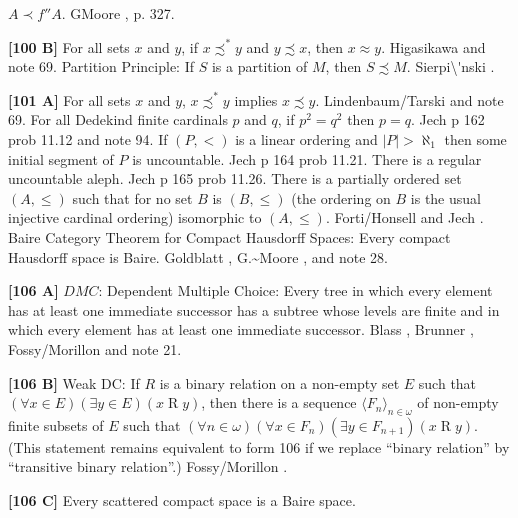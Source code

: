 $A \prec f''A$. G\. \ac{Moore} \cite{1982}, p. 327.
\smallskip
\item{}{\bf [100 B]} For all sets $x$ and $y$, if $x\precsim^* y$ and
$y\precsim x$, then $x\approx y$. \ac{Higasikawa} \cite{1995} and note 69.
\medskip
{}  Partition Principle:  If $S$ is a partition of
$M$, then $S \precsim M$.  \ac{Sierpi\'nski} \cite{1947}.
\smallskip
\item{}{\bf [101 A]}  For all sets $x$ and $y$, $x \precsim^* y$ implies
$x\precsim y$.  \ac{Lindenbaum/Tarski} \cite{1926} and note 69.
\medskip
{}  For all Dedekind finite cardinals $p$ and $q$, if
$p^{2} = q^{2}$ then $p = q$. \ac{Jech} \cite{1973b} p 162 prob 11.12 and
note 94.
\medskip
{}  If $(P,<)$ is a linear ordering and
$|P| > \aleph_{1}$ then some initial segment of $P$ is uncountable.
\ac{Jech} \cite{1973b} p 164 prob 11.21.
\medskip
{} There is a regular uncountable aleph. \ac{Jech}
\cite{1966b} p 165 prob 11.26.
\medskip
{} There is a  partially ordered set $(A,\le)$ such
that for no set $B$ is $(B,\le)$ (the ordering  on $B$ is the usual
injective cardinal ordering) isomorphic to $(A,\le)$. \ac{Forti/Honsell}
\cite{1985} and \ac{Jech} \cite{1966c}.
\medskip
{} Baire Category Theorem for Compact Hausdorff
Spaces: Every compact Hausdorff space is Baire.
\ac{Goldblatt} \cite{1985}, \ac{G.~Moore} \cite{1982}, and note 28.
\smallskip
\item{}{\bf [106 A]} $DMC$: Dependent Multiple Choice:  Every tree
in which every element has at least one immediate successor
has a subtree whose levels are finite and in which every element
has at least one immediate successor.  \ac{Blass} \cite{1979},
\ac{Brunner} \cite{1983c}, \ac{Fossy/Morillon} \cite{1998} and
note 21.
\smallskip
\item{}{\bf [106 B]} Weak DC: If $R$ is a binary relation on a non-empty
set $E$ such that $(\forall x\in E)(\exists y\in E)( x\mathrel R y)$,
then there is a sequence $\langle F_n\rangle_{n\in\omega}$ of
non-empty finite subsets of $E$ such that $(\forall n\in\omega)
(\forall x\in F_n)(\exists y\in F_{n+1}) (x\mathrel R y)$. (This
statement remains equivalent to form 106 if we replace ``binary relation''
by ``transitive binary relation''.)  \ac{Fossy/Morillon} \cite{1998}.
\smallskip
\item{}{\bf [106 C]}  Every scattered compact space is a Baire space.
